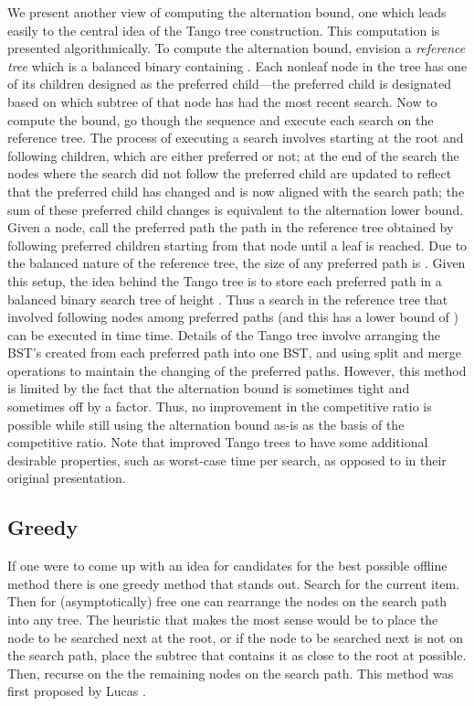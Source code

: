 \documentclass[11pt]{article}
\begin{document}
We present another view of computing the alternation bound, one which leads easily to the central idea of the Tango tree construction. This computation is presented algorithmically. To compute the alternation bound, envision a \emph{reference tree} which is a balanced binary containing . Each nonleaf node in the tree has one of its children designed as the preferred child---the preferred child is designated based on which subtree of that node has had the most recent search. Now to compute the bound, go though the sequence  and execute each search on the reference tree. The process of executing a search involves starting at the root and following children, which are either preferred or not; at the end of the search the nodes where the search did not follow the preferred child are updated to reflect that the preferred child has changed and is now aligned with the search path; the sum of these preferred child changes is equivalent to the alternation lower bound.
Given a node, call the preferred path the path in the reference tree obtained by following preferred children starting from that node until a leaf is reached. Due to the balanced nature of the reference tree, the size of any preferred path is . Given this setup, the idea behind the Tango tree is to store each preferred path in a balanced binary search tree of height . Thus a search in the reference tree that involved following  nodes among  preferred paths (and this has a lower bound of ) can be executed in time  time.
Details of the Tango tree involve arranging the BST's created from each preferred path into one BST, and using split and merge operations to maintain the changing of the preferred paths.
However, this method is limited by the fact that the alternation bound is sometimes tight and sometimes off by a  factor. Thus, no improvement in the competitive ratio is possible while still using the alternation bound as-is as the basis of the competitive ratio. Note that \cite{DBLP:conf/wads/DerryberryS09} improved Tango trees to have some additional desirable properties, such as  worst-case time per search, as opposed to  in their original presentation.



\subsection{Greedy}
If one were to come up with an idea for candidates for the best possible offline method there is one greedy method that stands out. Search for the current item. Then for (asymptotically) free one can rearrange the nodes on the search path into any tree. The heuristic that makes the most sense would be to place the node to be searched next at the root, or if the node to be searched next is not on the search path, place the subtree that contains it as close to the root at possible. Then, recurse on the the remaining nodes on the search path.  This method was first proposed by Lucas \cite{jltr}.
\end{document}
